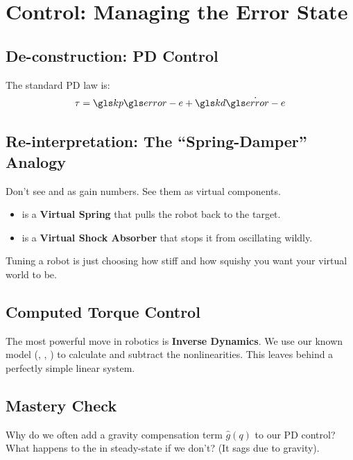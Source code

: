 \chapter{Control: Managing the Error State}


\section{De-construction: PD Control}
The standard PD law is:
\begin{equation}
    \tau = \sym{kp} \sym{error-e} + \sym{kd} \dot{\sym{error-e}}
\end{equation}

\section{Re-interpretation: The ``Spring-Damper'' Analogy}
\begin{intuitionbox}
    Don't see  and  as gain numbers. See them as virtual components.
    \begin{itemize}
        \item {} is a \textbf{Virtual Spring} that pulls the robot back to the target.
        \item {} is a \textbf{Virtual Shock Absorber} that stops it from oscillating wildly.
    \end{itemize}
    Tuning a robot is just choosing how stiff and how squishy you want your virtual world to be.
\end{intuitionbox}

\section{Computed Torque Control}
\begin{designrule}
    The most powerful move in robotics is \textbf{Inverse Dynamics}. We use our known model (, , ) to calculate and subtract the nonlinearities. This leaves behind a perfectly simple linear system.
\end{designrule}

\section{Mastery Check}
\begin{practice}
    Why do we often add a gravity compensation term \(\hat{g}(q)\) to our PD control? What happens to the  in steady-state if we don't? (It sags due to gravity).
\end{practice}
